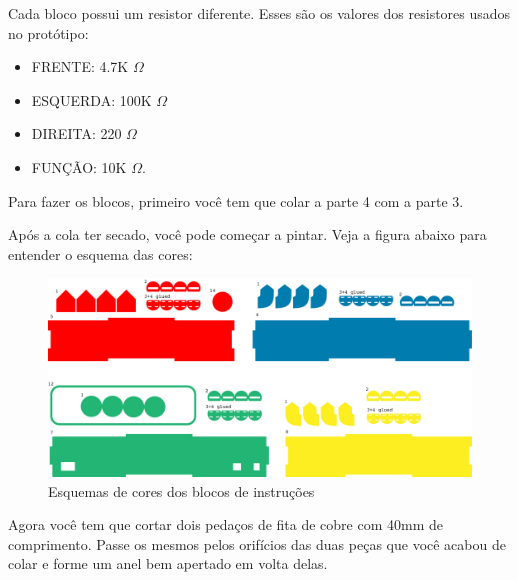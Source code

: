 \documentclass[paper=a4, fontsize=11pt]{scrartcl} %
\numberwithin{equation}{section} %
\numberwithin{figure}{section} %
\numberwithin{table}{section} %
\begin{document}
Cada bloco possui um resistor diferente. Esses são os valores dos resistores usados no protótipo:

\begin{itemize}
\item FRENTE: 4.7K $\Omega$
\item ESQUERDA: 100K $\Omega$
\item DIREITA: 220 $\Omega$
\item FUNÇÃO: 10K $\Omega$.
\end{itemize}


Para fazer os blocos, primeiro você tem que colar a parte 4 com a parte 3.

Após a cola ter secado, você pode começar a pintar. Veja a figura abaixo para entender o esquema das cores:

\begin{figure}[h] %
  \centering
  \includegraphics[scale=0.17]{./imagens/colors.jpg}
  \caption[ ]{Esquemas de cores dos blocos de instruções }
  \label{fig:bloco cor}
\end{figure}

Agora você tem que cortar dois pedaços de fita de cobre com 40mm de comprimento. Passe os mesmos pelos orifícios das duas peças que você acabou de colar e forme um anel bem apertado em volta delas.
\end{document}
